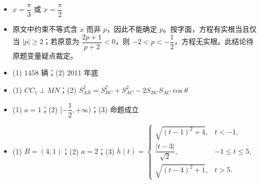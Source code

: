 \begin{itemize}[leftmargin=2.6em]
  \item[\textbf{17.}] $x=\dfrac\pi3$ 或 $x=\dfrac\pi2$
  \item[\textbf{18.}] 原文中约束不等式含 $x$ 而非 $p$，因此不能确定 $p$。按字面，方程有实根当且仅当 $|p|\ge2$；若原意为 $\dfrac{2p+1}{p+2}<0$，则 $-2<p< -\dfrac12$，方程无实根。此结论待原题变量疑点裁定。
  \item[\textbf{19.}] (1) $1458$ 辆；(2) 2011 年底
  \item[\textbf{20.}] (1) $CC_1\perp MN$；(2) $S_{AB}^2=S_{BC}^2+S_{AC}^2-2S_{BC}S_{AC}\cos\theta$
  \item[\textbf{21.}] (1) $a=1$；(2) $[-\dfrac12,+\infty)$；(3) 命题成立
  \item[\textbf{22.}] (1) $B=(4,1)$；(2) $a=2$；(3) $h(t)=\begin{cases}\sqrt{(t-1)^2+4},&t<-1,\\\dfrac{|t-3|}{\sqrt2},&-1\le t\le5,\\\sqrt{(t-4)^2+1},&t>5.\end{cases}$
\end{itemize}
